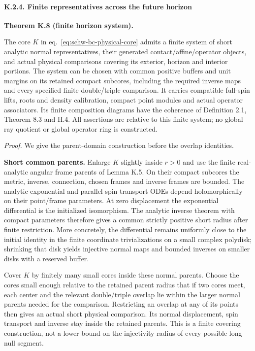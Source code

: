 \documentclass[
  english,
  11pt,
  reqno]{amsart}
\makeatletter
\newcommand{\pandocstatementheading}[1]{%
  \par\addpenalty{\@beginparpenalty}%
  \addvspace{.5\baselineskip plus .2\baselineskip minus .2\baselineskip}%
  {\normalfont\bfseries #1\par}%
  \nobreak\@afterindenttrue\@afterheading
}
\makeatother
\begin{document}
\protect{}\label{sec:sh-comparison-4}

\paragraph{K.2.4. Finite representatives across the future
horizon}\label{k.2.4.-finite-representatives-across-the-future-horizon}

\pandocstatementheading{\protect{}\label{thm:schw-bc-finite-horizon}Theorem K.8 (finite horizon system).}

The core \(K\) in eq.~\ref{eq:schw-bc-physical-core} admits a finite
system of short analytic normal representatives, their generated
contact/affine/operator objects, and actual physical comparisons
covering its exterior, horizon and interior portions. The system can be
chosen with common positive buffers and unit margins on its retained
compact subcores, including the required inverse maps and every
specified finite double/triple comparison. It carries compatible
full-spin lifts, roots and density calibration, compact point modules
and actual operator associators. Its finite composition diagrams have
the coherence of Definition 2.1, Theorem 8.3 and H.4. All assertions are
relative to this finite system; no global ray quotient or global
operator ring is constructed.

\emph{Proof.} We give the parent-domain construction before the overlap
identities.

\textbf{Short common parents.} Enlarge \(K\) slightly inside \(r>0\) and
use the finite real-analytic angular frame parents of Lemma K.5. On
their compact subcores the metric, inverse, connection, chosen frames
and inverse frames are bounded. The analytic exponential and
parallel-spin-transport ODEs depend holomorphically on their point/frame
parameters. At zero displacement the exponential differential is the
initialized isomorphism. The analytic inverse theorem with compact
parameters therefore gives a common strictly positive short radius after
finite restriction. More concretely, the differential remains uniformly
close to the initial identity in the finite coordinate trivializations
on a small complex polydisk; shrinking that disk yields injective normal
maps and bounded inverses on smaller disks with a reserved buffer.

Cover \(K\) by finitely many small cores inside these normal parents.
Choose the cores small enough relative to the retained parent radius
that if two cores meet, each center and the relevant double/triple
overlap lie within the larger normal parents needed for the comparison.
Restricting an overlap at any of its points then gives an actual short
physical comparison. Its normal displacement, spin transport and inverse
stay inside the retained parents. This is a finite covering
construction, not a lower bound on the injectivity radius of every
possible long null segment.
\end{document}
